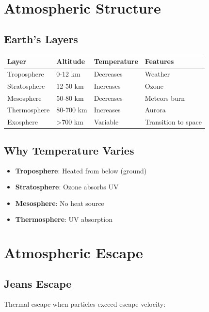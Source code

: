 \documentclass[
  11pt,
  letterpaper,
  twoside,
  openright]{book}
\providecommand{\tightlist}{%
  \setlength{\itemsep}{0pt}\setlength{\parskip}{0pt}}
\begin{document}
\section{Atmospheric Structure}\label{atmospheric-structure}

\subsection{Earth's Layers}\label{earths-layers-1}

\begin{longtable}[]{@{}llll@{}}
\toprule\noalign{}
Layer & Altitude & Temperature & Features \\
\midrule\noalign{}
\endhead
\bottomrule\noalign{}
\endlastfoot
Troposphere & 0-12 km & Decreases & Weather \\
Stratosphere & 12-50 km & Increases & Ozone \\
Mesosphere & 50-80 km & Decreases & Meteors burn \\
Thermosphere & 80-700 km & Increases & Aurora \\
Exosphere & \textgreater700 km & Variable & Transition to space \\
\end{longtable}

\subsection{Why Temperature Varies}\label{why-temperature-varies}

\begin{itemize}
\tightlist
\item
  \textbf{Troposphere}: Heated from below (ground)
\item
  \textbf{Stratosphere}: Ozone absorbs UV
\item
  \textbf{Mesosphere}: No heat source
\item
  \textbf{Thermosphere}: UV absorption
\end{itemize}

\section{Atmospheric Escape}\label{atmospheric-escape}

\subsection{Jeans Escape}\label{jeans-escape}

Thermal escape when particles exceed escape velocity:
\end{document}
